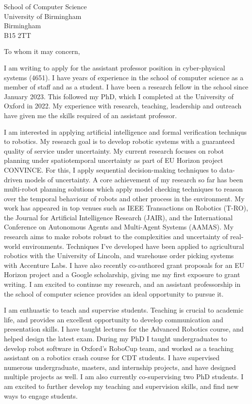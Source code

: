 \documentclass[12pt]{letter}
\begin{document}
\begin{letter}{School of Computer Science \\ University of Birmingham \\ Birmingham \\ B15 2TT}
\opening{To whom it may concern,}


I am writing to apply for the assistant professor position in cyber-physical systems (4651).
%
I have years of experience in the school of computer science as a member of staff and as a student.
%
I have been a research fellow in the school since January 2023.
%
This followed my PhD, which I completed at the University of Oxford in 2022.
%
My experience with research, teaching, leadership and outreach have given me the skills required of an assistant professor.



I am interested in applying artificial intelligence and formal verification techniqus to robotics.
%
My research goal is to develop robotic systems with a guaranteed quality of service under uncertainty.
%
My current research focuses on robot planning under spatiotemporal uncertainty as part of EU Horizon project CONVINCE.
%
For this, I apply sequential decision-making techniques to data-driven models of uncertainty.
%
A core achievement of my research so far has been multi-robot planning solutions which apply model checking techniques to reason over the temporal behaviour of robots and other process in the environment.
%
My work has appeared in top venues such as IEEE Transactions on Robotics (T-RO), the Journal for Artificial Intelligence Research (JAIR), and the International Conference on Autonomous Agents and Multi-Agent Systems (AAMAS).
%
My research aims to make robots robust to the complexities and uncertainty of real-world environments.
%
Techniques I've developed have been applied to agricultural robotics with the University of Lincoln, and warehouse order picking systems with Accenture Labs.
%
I have also recently co-authored grant proposals for an EU Horizon project and a Google scholarship, giving me my first exposure to grant writing.
%
I am excited to continue my research, and an assistant professorship in the school of computer science provides an ideal opportunity to pursue it.

I am enthuastic to teach and supervise students.
%
Teaching is crucial to academic life, and provides an excellent opportunity to develop communication and presentation skills.
%
I have taught lectures for the Advanced Robotics course, and helped design the latest exam.
%
During my PhD I taught undergraduates to develop robot software in Oxford's RoboCup team, and worked as a teaching assistant on a robotics crash course for CDT students.
%
I have supervised numerous undergraduate, masters, and internship projects, and have designed multiple projects as well.
%
I am also currently co-supervising two PhD students.
%
I am excited to further develop my teaching and supervision skills, and find new ways to engage students.


\end{letter}
\end{document}
